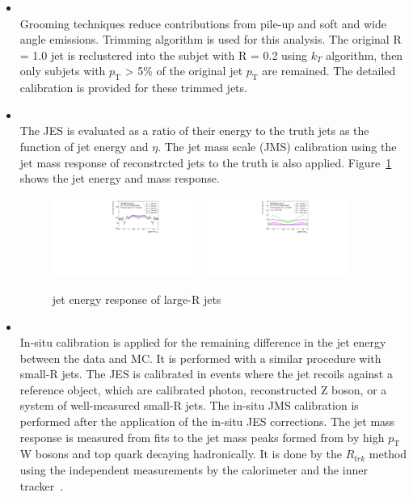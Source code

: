 \begin{itemize}
    \item \textbf{} \\
    Grooming techniques reduce contributions from pile-up and soft and wide angle emissions. 
    Trimming algorithm \cite{Krohn2010} is used for this analysis. 
     The original R = 1.0 jet is reclustered into the subjet with R = 0.2 using $k_T$ algorithm, then only subjets with $p_\mathrm{T}$ > 5\% of the original jet $p_\mathrm{T}$ are remained.
    The detailed calibration is provided for these trimmed jets.
    \item \textbf{}\\
    The JES is evaluated as a ratio of their energy to the truth jets as the function of jet energy and $\eta$. The jet mass scale (JMS)  calibration using the jet mass response of reconstrcted jets to the truth is also applied.
    Figure~\ref{fig:largeRresponse} shows the jet energy and mass response. 
    \begin{figure}[tbp]
    \begin{center}
    \includegraphics[width=0.45\textwidth,keepaspectratio]{figures/Reconstruction/responsept}
    \includegraphics[width=0.45\textwidth,keepaspectratio]{figures/Reconstruction/responsemass}
    \caption{
    jet energy response of large-R jets \cite{JETM-2018-02}
    }
    \label{fig:largeRresponse}
    \end{center}
    \end{figure} 
    \item  \textbf{} \\
    In-situ calibration is applied for the remaining difference in the jet energy between the data and MC. 
    It is performed with a similar procedure with small-R jets. 
    The JES is calibrated in events where the jet recoils against a reference object, which are calibrated photon, reconstructed Z boson, or a system of well-measured small-R jets. The in-situ JMS calibration is performed after the application of the in-situ JES corrections. The jet mass response is measured from fits to the jet mass peaks formed from by high $p_\mathrm{T}$ W bosons and top quark decaying hadronically. 
    It is done by the $R_{trk}$ method using the independent measurements by the calorimeter and the inner tracker~\cite{JETM-2018-02}. 
\end{itemize}

